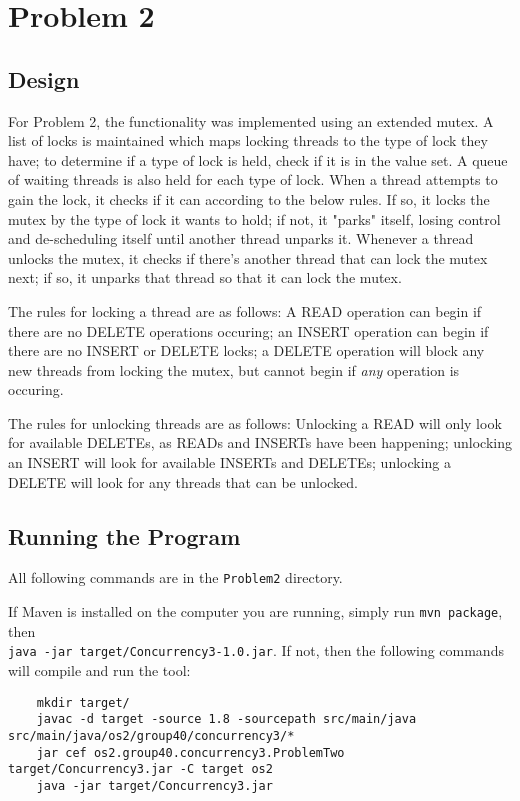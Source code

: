 \documentclass[onecolumn, draftclsnofoot,10pt, compsoc]{IEEEtran}
\begin{document}
\section*{Problem 2}
\subsection*{Design}
For Problem 2, the functionality was implemented using an extended mutex. A list of locks is maintained which maps locking threads to the type of lock they have; to determine if a type of lock is held, check if it is in the value set. A queue of waiting threads is also held for each type of lock. When a thread attempts to gain the lock, it checks if it can according to the below rules. If so, it locks the mutex by the type of lock it wants to hold; if not, it "parks" itself, losing control and de-scheduling itself until another thread unparks it. Whenever a thread unlocks the mutex, it checks if there's another thread that can lock the mutex next; if so, it unparks that thread so that it can lock the mutex.

The rules for locking a thread are as follows: A READ operation can begin if there are no DELETE operations occuring; an INSERT operation can begin if there are no INSERT or DELETE locks; a DELETE operation will block any new threads from locking the mutex, but cannot begin if \textit{any} operation is occuring.

The rules for unlocking threads are as follows: Unlocking a READ will only look for available DELETEs, as READs and INSERTs have been happening; unlocking an INSERT will look for available INSERTs and DELETEs; unlocking a DELETE will look for any threads that can be unlocked.

\subsection*{Running the Program}
All following commands are in the \verb+Problem2+ directory.

If Maven is installed on the computer you are running, simply run \verb+mvn package+, then \\
\verb+java -jar target/Concurrency3-1.0.jar+. If not, then the following commands will compile and run the tool:

\begin{verbatim}
	mkdir target/
	javac -d target -source 1.8 -sourcepath src/main/java src/main/java/os2/group40/concurrency3/*
	jar cef os2.group40.concurrency3.ProblemTwo target/Concurrency3.jar -C target os2
	java -jar target/Concurrency3.jar
\end{verbatim}
\end{document}
